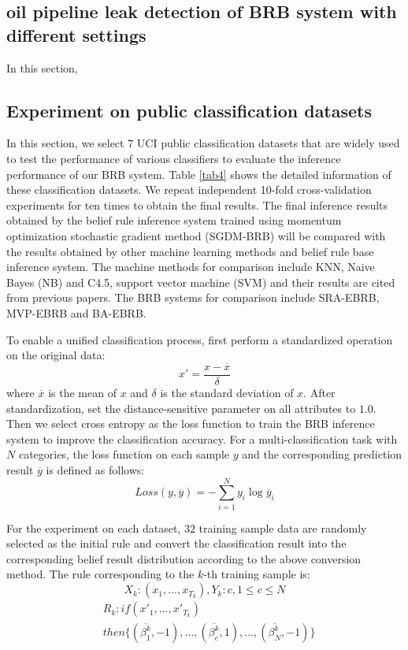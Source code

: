 \documentclass{ieeeaccess}
\begin{document}
\subsection{oil pipeline leak detection of BRB system with different settings}
In this section,

\subsection{Experiment on public classification datasets}
In this section, we select 7 UCI public classification datasets that are widely used to test the performance of various classifiers to evaluate the inference performance of our BRB system.
Table \ref{tab4} shows the detailed information of these classification datasets.
We repeat independent 10-fold cross-validation experiments for ten times to obtain the final results.
The final inference results obtained by the belief rule inference system trained using momentum optimization stochastic gradient method (SGDM-BRB) will be compared with the results obtained by
other machine learning methods and belief rule base inference system.
The machine methods for comparison include KNN, Naive Bayes (NB) and C4.5, support vector machine (SVM)
and their results are cited from previous papers\cite{a22,a27}.
The BRB systems for comparison include SRA-EBRB\cite{a20}, MVP-EBRB\cite{a21} and BA-EBRB\cite{a22}.

To enable a unified classification process, first perform a standardized operation on the original data:
$$x'=\frac{x-\overline{x}}{\delta}$$
where $\overline{x}$ is the mean of $x$ and $\delta$ is the standard deviation of $x$.
After standardization, set the distance-sensitive parameter on all attributes to $1.0$.
Then we select cross entropy as the loss function to train the BRB inference system to improve the classification accuracy.
For a multi-classification task with $N$ categories, the loss function on each sample $y$ and the corresponding prediction result $\overline{y}$ is defined as follows:
$$Loss(y,\overline{y})=-\sum_{i=1}^Ny_{i}\log\overline{y}_i$$

For the experiment on each dataset, $32$ training sample data are randomly selected as the initial rule
and convert the classification result into the corresponding belief result distribution according to the above conversion method.
The rule corresponding to the $k$-th training sample is:
\begin{equation}
    X_k:(x_1,...,x_{T_k}),Y_k:c,1\leq c\leq N
\end{equation}
\begin{equation}
    \begin{split}
        &R_k:if(x'_1,...,x'_{T_k})\\
        &then\{(\overline{\beta_1^k},-1),...,(\overline{\beta_c^k},1),...,(\overline{\beta_N^k},-1)\}
    \end{split}
\end{equation}
\end{document}
